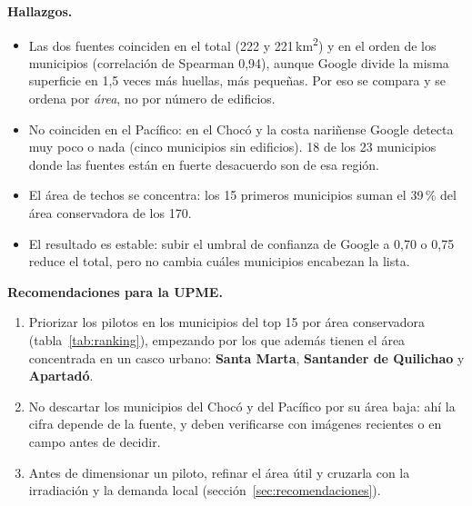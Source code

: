 \textbf{Hallazgos.}
\begin{itemize}
  \item Las dos fuentes coinciden en el total (222 y 221\,km\textsuperscript{2})
        y en el orden de los municipios (correlación de Spearman 0,94), aunque
        Google divide la misma superficie en 1,5 veces más huellas, más
        pequeñas. Por eso se compara y se ordena por \emph{área}, no por
        número de edificios.
  \item No coinciden en el Pacífico: en el Chocó y la costa nariñense Google
        detecta muy poco o nada (cinco municipios sin edificios). 18 de los
        23 municipios donde las fuentes están en fuerte desacuerdo son de esa
        región.
  \item El área de techos se concentra: los 15 primeros municipios suman el
        39\,\% del área conservadora de los 170.
  \item El resultado es estable: subir el umbral de confianza de Google a
        0,70 o 0,75 reduce el total, pero no cambia cuáles municipios
        encabezan la lista.
\end{itemize}

\textbf{Recomendaciones para la UPME.}
\begin{enumerate}
  \item Priorizar los pilotos en los municipios del top 15 por área
        conservadora (tabla~\ref{tab:ranking}), empezando por los que además
        tienen el área concentrada en un casco urbano: \textbf{Santa Marta},
        \textbf{Santander de Quilichao} y \textbf{Apartadó}.
  \item No descartar los municipios del Chocó y del Pacífico por su área
        baja: ahí la cifra depende de la fuente, y deben verificarse con
        imágenes recientes o en campo antes de decidir.
  \item Antes de dimensionar un piloto, refinar el área útil y cruzarla con
        la irradiación y la demanda local (sección~\ref{sec:recomendaciones}).
\end{enumerate}

\newpage
